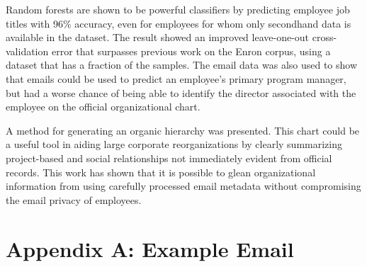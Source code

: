 \documentclass[12pt]{report}
\begin{document}
Random forests are shown to be powerful classifiers by predicting employee job titles with 96\% accuracy, even for employees for whom only secondhand data is available in the dataset.
The result showed an improved leave-one-out cross-validation error that surpasses previous work on the Enron corpus, using a dataset that has a fraction of the samples.
The email data was also used to show that emails could be used to predict an employee's primary program manager, but had a worse chance of being able to identify the director associated with the employee on the official organizational chart.

A method for generating an organic hierarchy was presented.
This chart could be a useful tool in aiding large corporate reorganizations by clearly summarizing project-based and social relationships not immediately evident from official records.
This work has shown that it is possible to glean organizational information from using carefully processed email metadata without compromising the email privacy of employees.


%
%

%






\appendix

\chapter*{Appendix A: Example Email}
\end{document}
